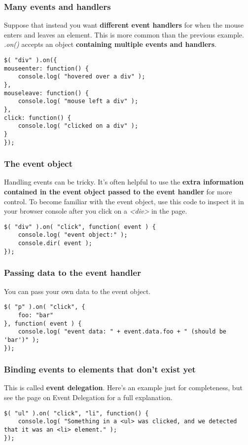 \documentclass[10pt,letterpaper]{report}
\begin{document}
\subsubsection{Many events and handlers}
Suppose that instead you want \textbf{different event handlers} for when the mouse enters and leaves an element. This is more common than the previous example.\\
\textit{.on()} accepts an object \textbf{containing multiple events and handlers}.
\begin{lstlisting}
$( "div" ).on({
mouseenter: function() {
	console.log( "hovered over a div" );
},
mouseleave: function() {
	console.log( "mouse left a div" );
},
click: function() {
	console.log( "clicked on a div" );
}
});
\end{lstlisting}
\subsubsection{The event object}
Handling events can be tricky. It's often helpful to use the \textbf{extra information contained in the event object passed to the event handler} for more control. To become familiar with the event object, use this code to inspect it in your browser console after you click on a \textit{<div>} in the page.
\begin{lstlisting}
$( "div" ).on( "click", function( event ) {
	console.log( "event object:" );
	console.dir( event );
});
\end{lstlisting}
\subsubsection{Passing data to the event handler}
You can pass your own data to the event object.
\begin{lstlisting}
$( "p" ).on( "click", {
	foo: "bar"
}, function( event ) {
	console.log( "event data: " + event.data.foo + " (should be 'bar')" );
});
\end{lstlisting}
\subsubsection{Binding events to elements that don't exist yet}
This is called \textbf{event delegation}. Here's an example just for completeness, but see the page on Event Delegation for a full explanation.
\begin{lstlisting}
$( "ul" ).on( "click", "li", function() {
	console.log( "Something in a <ul> was clicked, and we detected that it was an <li> element." );
});
\end{lstlisting}
\end{document}
